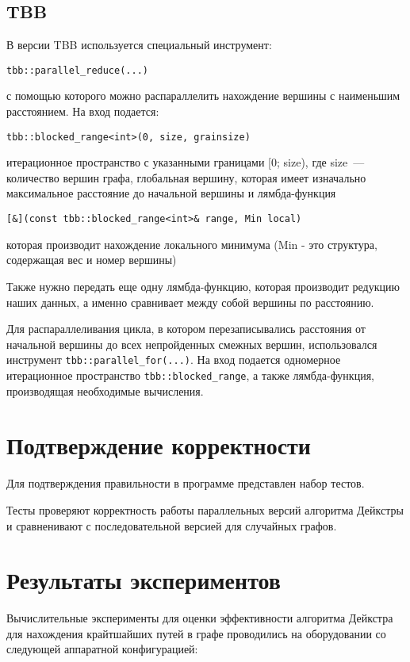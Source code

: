 \documentclass{report}
\begin{document}
\subsection*{TBB}
В версии TBB используется специальный инструмент:
\par\verb|tbb::parallel_reduce(...)|
\par с помощью которого можно распараллелить нахождение вершины с наименьшим расстоянием. На вход подается: \par\verb|tbb::blocked_range<int>(0, size, grainsize)| 
\par итерационное пространство с указанными границами [0; size), где size~--- количество вершин графа, глобальная вершину, которая имеет изначально максимальное расстояние до начальной вершины и лямбда-функция \par\verb|[&](const tbb::blocked_range<int>& range, Min local) | 
\par которая производит нахождение локального минимума (Min - это структура, содержащая вес и номер вершины) 
\par Также нужно передать еще одну лямбда-функцию, которая производит редукцию наших данных, а именно сравнивает между собой вершины по расстоянию.
\par Для распараллеливания цикла, в котором перезаписывались расстояния от начальной вершины до всех непройденных смежных вершин, использовался инструмент  \verb|tbb::parallel_for(...)|. На вход подается одномерное итерационное пространство \verb|tbb::blocked_range|, а также лямбда-функция, производящая необходимые вычисления.
\newpage


\section*{Подтверждение корректности}
Для подтверждения правильности в программе представлен набор тестов.
\par Тесты проверяют корректность работы параллельных версий алгоритма Дейкстры и сравненивают с последовательной версией для случайных графов.
\newpage

\section*{Результаты экспериментов}
Вычислительные эксперименты для оценки эффективности алгоритма Дейкстра для нахождения крайтшайших путей в графе проводились на оборудовании со следующей аппаратной конфигурацией:
\end{document}
